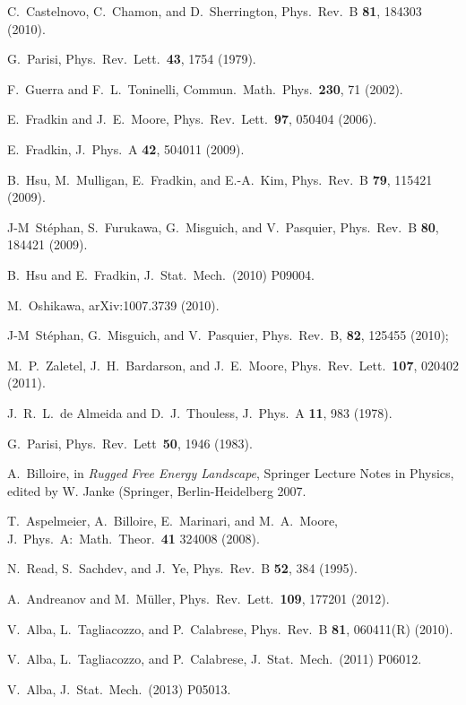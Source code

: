 \documentclass[twocolumn,superscriptaddress,prb,10pt]{revtex4-1}
\begin{document}
\begin{thebibliography}{99}
C.~Castelnovo, C.~Chamon, and D.~Sherrington, Phys.\ Rev.\ B {\bf 81}, 184303 (2010).

G.~Parisi, Phys.\ Rev.\ Lett.\ {\bf 43}, 1754 (1979).

F.~Guerra and F.~L.~Toninelli, Commun.\ Math.\ Phys.\ {\bf 230}, 71 (2002). 

E.~Fradkin and J.~E.~Moore, Phys.\ Rev.\ Lett.\ {\bf 97}, 050404 (2006). 

E.~Fradkin, J.\ Phys.\  A {\bf 42}, 504011 (2009). 

B.~Hsu, M.~Mulligan, E.~Fradkin, and E.-A.~Kim, Phys.\ Rev.\ B {\bf 79}, 115421 (2009).

J-M~St\'ephan, S.~Furukawa, G.~Misguich, and V.~Pasquier, Phys.\ Rev.\ B {\bf 80}, 
184421 (2009).

B.~Hsu and E.~Fradkin, J.\ Stat.\ Mech.\  (2010) P09004. 

M.~Oshikawa, arXiv:1007.3739 (2010).

J-M~St\'ephan, G.~Misguich, and V.~Pasquier, Phys.\ Rev.\ B, {\bf 82}, 125455 
(2010); 

M.~P.~Zaletel, J.~H.~Bardarson, and J.~E.~Moore, Phys.\ Rev.\ Lett.\ {\bf 107}, 
020402 (2011).

J.~R.~L.~de Almeida and D.~J.~Thouless, J.\ Phys.\ A {\bf 11}, 983 (1978). 

G.~Parisi, Phys.\ Rev.\ Lett\ {\bf 50}, 1946 (1983). 

A.~Billoire, in \emph{Rugged Free Energy Landscape}, Springer Lecture 
Notes in Physics, edited by W. Janke (Springer, Berlin-Heidelberg 
2007. 

T.~Aspelmeier, A.~Billoire, E.~Marinari, and M.~A.~Moore, 
J.\ Phys.\ A:\ Math.\ Theor.\ {\bf 41} 324008 (2008). 

N.~Read, S.~Sachdev, and J.~Ye, Phys.\ Rev.\ B {\bf 52}, 384 (1995). 

A.~Andreanov and M.~M\"uller, Phys.\ Rev.\ Lett.\ {\bf 109}, 177201 (2012). 

V.~Alba, L.~Tagliacozzo, and P.~Calabrese, Phys.\ Rev.\ B {\bf 81}, 060411(R) (2010).

V.~Alba, L.~Tagliacozzo, and P.~Calabrese, J.\ Stat.\ Mech.\ (2011) P06012. 

V.~Alba, J.\ Stat.\ Mech.\ (2013) P05013. 



\end{thebibliography}
\end{document}
